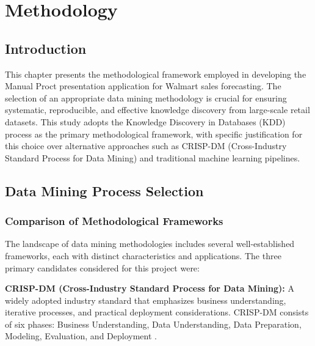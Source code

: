 %
%
%

\chapter{Methodology}
\label{ch:methodology}

\section{Introduction}
\label{sec:methodology_intro}

This chapter presents the methodological framework employed in developing the Manual Proct presentation application for Walmart sales forecasting. The selection of an appropriate data mining methodology is crucial for ensuring systematic, reproducible, and effective knowledge discovery from large-scale retail datasets. This study adopts the Knowledge Discovery in Databases (KDD) process as the primary methodological framework, with specific justification for this choice over alternative approaches such as CRISP-DM (Cross-Industry Standard Process for Data Mining) and traditional machine learning pipelines.

\section{Data Mining Process Selection}
\label{sec:process_selection}

\subsection{Comparison of Methodological Frameworks}
\label{subsec:framework_comparison}

The landscape of data mining methodologies includes several well-established frameworks, each with distinct characteristics and applications. The three primary candidates considered for this project were:

\textbf{CRISP-DM (Cross-Industry Standard Process for Data Mining):} A widely adopted industry standard that emphasizes business understanding, iterative processes, and practical deployment considerations. CRISP-DM consists of six phases: Business Understanding, Data Understanding, Data Preparation, Modeling, Evaluation, and Deployment \cite{Shearer:2000}.


